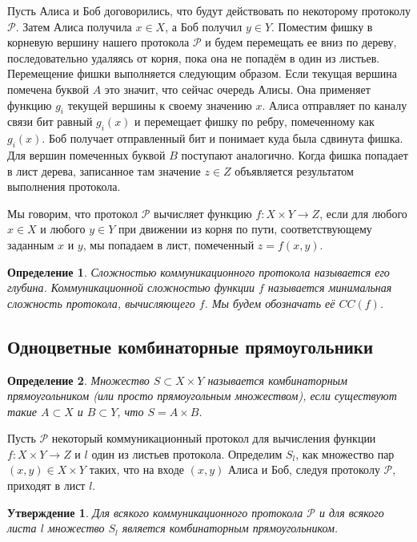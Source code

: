 \documentclass[a4paper]{article}
\newtheorem*{mclaim}{Утверждение}
\newtheorem*{mdefinition}{Определение}
\begin{document}
Пусть Алиса и Боб договорились, что будут действовать по некоторому протоколу $\mathcal{P}$. Затем
Алиса получила $x\in X$, а Боб получил $y\in Y$. Поместим фишку в корневую вершину нашего протокола
$\mathcal{P}$ и будем перемещать ее вниз по дереву, последовательно удаляясь от корня,
пока она не попадём в один из листьев. Перемещение фишки выполняется следующим образом. Если текущая 
вершина помечена буквой $A$ это значит, что сейчас очередь Алисы. Она применяет функцию $g_i$ текущей 
вершины к своему значению $x$. Алиса отправляет по каналу связи бит равный $g_i(x)$ и перемещает
фишку по ребру, помеченному как $g_i(x)$. Боб получает отправленный бит и понимает куда была сдвинута фишка.
Для вершин помеченных буквой $B$ поступают аналогично. Когда фишка попадает в лист дерева,
записанное там значение $z\in Z$ объявляется результатом выполнения протокола.

Мы говорим, что протокол $\mathcal{P}$ вычисляет функцию $f:X\times Y \rightarrow Z$, если для любого
$x\in X$ и любого $y\in Y$ при движении из корня по пути, соответствующему заданным $x$ и $y$,
мы попадаем в лист, помеченный $z=f(x,y)$.

\begin{mdefinition}
	Сложностью коммуникационного протокола называется его глубина. Коммуникационной сложностью функции 
	$f$ называется минимальная сложность протокола, вычисляющего $f$. Мы будем обозначать её $CC(f)$.
\end{mdefinition}


\subsection{Одноцветные комбинаторные прямоугольники}
\begin{mdefinition}
	Множество $S \subset X\times Y$ называется комбинаторным прямоугольником (или просто прямоугольным
	множеством), если существуют такие $A \subset X$ и $B \subset Y$, что $S = A\times B$.
\end{mdefinition}

Пусть $\mathcal{P}$ некоторый коммуникационный протокол для вычисления функции $f:X\times Y \rightarrow Z$ 
и $l$ один из листьев протокола. Определим $S_l$, как множество пар $(x, y) \in X\times Y$ таких, что 
на входе $(x,y)$ Алиса и Боб, следуя протоколу $\mathcal{P}$, приходят в лист $l$.

\begin{mclaim}
    Для всякого коммуникационного протокола $\mathcal{P}$ и для всякого листа $l$ множество $S_l$
    является комбинаторным прямоугольником. 
\end{mclaim}
\end{document}
